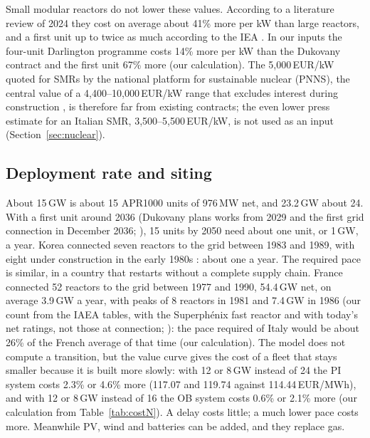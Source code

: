 Small modular reactors do not lower these values. According to a literature review of 2024 they cost on average about 41\% more per kW than large reactors, and a first unit up to twice as much according to the IEA \citep{HSFSMR2026}. In our inputs the four-unit Darlington programme costs 14\% more per kW than the Dukovany contract and the first unit 67\% more (our calculation). The 5{,}000\,EUR/kW quoted for SMRs by the national platform for sustainable nuclear (PNNS), the central value of a 4{,}400--10{,}000\,EUR/kW range that excludes interest during construction \citep{QESMR2026}, is therefore far from existing contracts; the even lower press estimate for an Italian SMR, 3{,}500--5{,}500\,EUR/kW, is not used as an input (Section~\ref{sec:nuclear}).

\subsection{Deployment rate and siting}\label{sec:deployment}
About 15\,GW is about 15 APR1000 units of 976\,MW net, and 23.2\,GW about 24. With a first unit around 2036 (Dukovany plans works from 2029 and the first grid connection in December 2036; \citealp{ECDukovany2026}), 15 units by 2050 need about one unit, or 1\,GW, a year. Korea connected seven reactors to the grid between 1983 and 1989, with eight under construction in the early 1980s \citep{WNAKorea}: about one a year. The required pace is similar, in a country that restarts without a complete supply chain. France connected 52 reactors to the grid between 1977 and 1990, 54.4\,GW net, on average 3.9\,GW a year, with peaks of 8 reactors in 1981 and 7.4\,GW in 1986 (our count from the IAEA tables, with the Superph\'enix fast reactor and with today's net ratings, not those at connection; \citealp{IAEACNPPFrance}): the pace required of Italy would be about 26\% of the French average of that time (our calculation). The model does not compute a transition, but the value curve gives the cost of a fleet that stays smaller because it is built more slowly: with 12 or 8\,GW instead of 24 the PI system costs 2.3\% or 4.6\% more (117.07 and 119.74 against 114.44\,EUR/MWh), and with 12 or 8\,GW instead of 16 the OB system costs 0.6\% or 2.1\% more (our calculation from Table~\ref{tab:costN}). A delay costs little; a much lower pace costs more. Meanwhile PV, wind and batteries can be added, and they replace gas.

